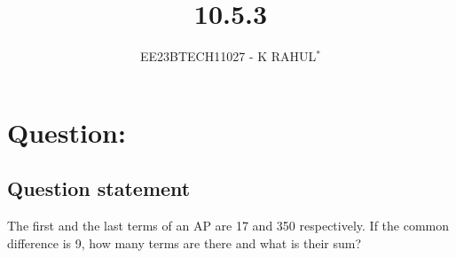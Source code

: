 \documentclass[journal,12pt,twocolumn]{IEEEtran}
\theoremstyle{remark}
\begin{document}

\vspace{3cm}
\title{10.5.3}
\author{EE23BTECH11027 - K RAHUL$^{*}$%
}
\maketitle
\newpage
\bigskip
\renewcommand{\thefigure}{\theenumi}
\renewcommand{\thetable}{\theenumi}
\section{Question:}
\subsection{Question statement}
The first and the last terms of an AP are 17 and 350 respectively. If the common difference
is 9, how many terms are there and what is their sum?
\end{document}
